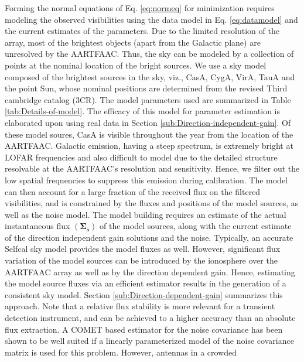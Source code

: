 \documentclass{aa}
\begin{document}
Forming the  normal equations of  Eq. \ref{eq:normeq} for  minimization requires
modeling    the    observed   visibilities    using    the    data   model    in
Eq. \ref{eq:datamodel} and the current  estimates of the parameters.  Due to the
limited resolution of  the array, most of the brightest  objects (apart from the
Galactic plane) are unresolved by the AARTFAAC.  Thus, the sky can be modeled by
a collection of points  at the nominal location of the bright  sources. We use a
sky model composed of the brightest  sources in the sky, viz., CasA, CygA, VirA,
TauA and the point Sun, whose  nominal positions are determined from the revised
Third cambridge catalog (3CR). The model parameters used are summarized in Table
\ref{tab:Details-of-model}. The efficacy of  this model for parameter estimation
is      elaborated      upon      using      real      data      in      Section
\ref{sub:Direction-independent-gain}.   Of these model  soures, CasA  is visible
throughout the year from the location of the AARTFAAC. Galactic emission, having
a steep spectrum, is extremely bright at LOFAR frequencies and also difficult to
model due to the detailed  structure resolvable at the AARTFAAC's resolution and
sensitivity. Hence, we  filter out the low spatial  frequencies to suppress this
emission during calibration. The model can  then account for a large fraction of
the received flux on the filtered visibilities, and is constrained by the fluxes
and  positions of  the model  sources, as  well as  the noise  model.  The model
building   requires    an   estimate   of   the    actual   instantaneous   flux
$\left(\mathbf{\Sigma_{s}}\right)$ of the model  sources, along with the current
estimate of the  direction independent gain solutions and  the noise. Typically,
an  accurate Selfcal  sky  model provides  the  model fluxes  as well.  However,
significant  flux  variation of  the  model sources  can  be  introduced by  the
ionosphere  over  the AARTFAAC  array  as well  as  by  the direction  dependent
gain.  Hence, estimating  the model  source  fluxes via  an efficient  estimator
results   in    the   generation   of   a   consistent    sky   model.   Section
\ref{sub:Direction-dependent-gain}  summarizes   this  approach.  Note   that  a
relative flux stability  is more relevant for a  transient detection instrument,
and can  be achieved to  a higher accuracy  than an absolute flux  extraction. A
COMET based estimator for the noise  covariance has been shown to be well suited
if a  linearly parameterized model  of the noise  covariance matrix is  used for
this  problem\citep{ottersten1998covariance}.  However,  antennas in  a  crowded
\end{document}
